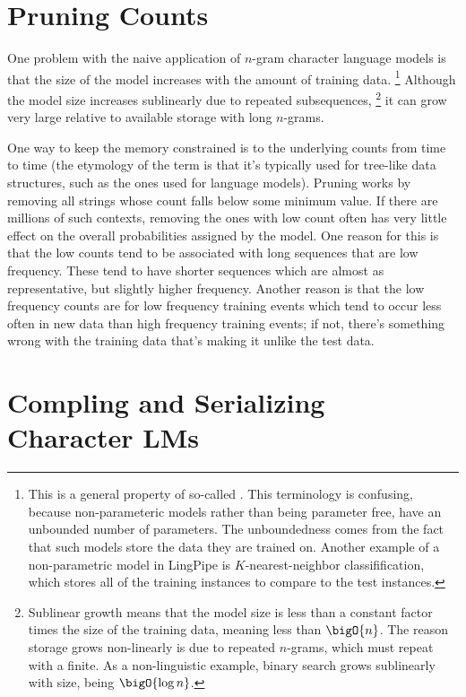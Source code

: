 \section{Pruning Counts}\label{section:char-lm-pruning}

One problem with the naive application of $n$-gram character language
models is that the size of the model increases with the amount of
training data.%
%
\footnote{This is a general property of so-called
  .  This terminology is confusing,
  because non-parameteric models rather than being parameter free,
  have an unbounded number of parameters.  The unboundedness comes
  from the fact that such models store the data they are trained on.
  Another example of a non-parametric model in LingPipe is
  $K$-nearest-neighbor classifification, which stores all of
  the training instances to compare to the test instances.}
%
Although the model size increases sublinearly due to repeated
subsequences,%
%
\footnote{Sublinear growth means that the model size is less than a
  constant factor times the size of the training data, meaning less
  than $\bigO{n}$.  The reason storage grows non-linearly is due to
  repeated $n$-grams, which must repeat with a finite.  As a
  non-linguistic example, binary search grows sublinearly with size,
  being $\bigO{\log n}$.}
%
it can grow very large relative to available storage with
long $n$-grams.

One way to keep the memory constrained is to  the
underlying counts from time to time (the etymology of the term is that
it's typically used for tree-like data structures, such as the ones
used for language models).  Pruning works by removing all strings
whose count falls below some minimum value.  If there are millions of
such contexts, removing the ones with low count often has very little
effect on the overall probabilities assigned by the model.  One reason
for this is that the low counts tend to be associated with long
sequences that are low frequency.  These tend to have shorter
sequences which are almost as representative, but slightly higher
frequency.  Another reason is that the low frequency counts are for
low frequency training events which tend to occur less often in new
data than high frequency training events; if not, there's something
wrong with the training data that's making it unlike the test data.



\section{Compling and Serializing Character LMs}

